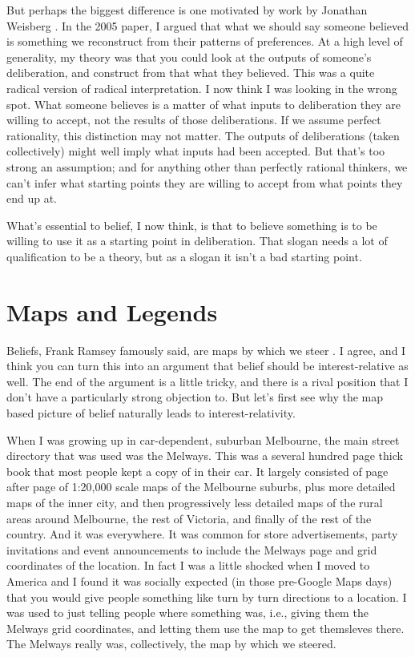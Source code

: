 \documentclass[11pt,]{book}
\begin{document}
But perhaps the biggest difference is one motivated by work by Jonathan Weisberg \citetext{\citeyear{Weisberg2013}; \citeyear{Weisberg2020}}. In the 2005 paper, I argued that what we should say someone believed is something we reconstruct from their patterns of preferences. At a high level of generality, my theory was that you could look at the outputs of someone's deliberation, and construct from that what they believed. This was a quite radical version of radical interpretation. I now think I was looking in the wrong spot. What someone believes is a matter of what inputs to deliberation they are willing to accept, not the results of those deliberations. If we assume perfect rationality, this distinction may not matter. The outputs of deliberations (taken collectively) might well imply what inputs had been accepted. But that's too strong an assumption; and for anything other than perfectly rational thinkers, we can't infer what starting points they are willing to accept from what points they end up at.

What's essential to belief, I now think, is that to believe something is to be willing to use it as a starting point in deliberation. That slogan needs a lot of qualification to be a theory, but as a slogan it isn't a bad starting point.

\hypertarget{mapslegends}{%
\section{Maps and Legends}\label{mapslegends}}

Beliefs, Frank Ramsey famously said, are maps by which we steer \citep[146]{RamseyGeneralProp}. I agree, and I think you can turn this into an argument that belief should be interest-relative as well. The end of the argument is a little tricky, and there is a rival position that I don't have a particularly strong objection to. But let's first see why the map based picture of belief naturally leads to interest-relativity.

When I was growing up in car-dependent, suburban Melbourne, the main street directory that was used was the Melways. This was a several hundred page thick book that most people kept a copy of in their car. It largely consisted of page after page of 1:20,000 scale maps of the Melbourne suburbs, plus more detailed maps of the inner city, and then progressively less detailed maps of the rural areas around Melbourne, the rest of Victoria, and finally of the rest of the country. And it was everywhere. It was common for store advertisements, party invitations and event announcements to include the Melways page and grid coordinates of the location. In fact I was a little shocked when I moved to America and I found it was socially expected (in those pre-Google Maps days) that you would give people something like turn by turn directions to a location. I was used to just telling people where something was, i.e., giving them the Melways grid coordinates, and letting them use the map to get themsleves there. The Melways really was, collectively, the map by which we steered.
\end{document}
